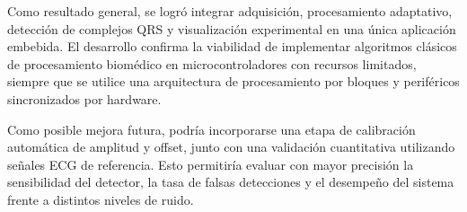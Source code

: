 \documentclass[12pt]{article}
\begin{document}
		Como resultado general, se logró integrar adquisición, procesamiento adaptativo, detección de complejos QRS y visualización experimental en una única aplicación embebida. El desarrollo confirma la viabilidad de implementar algoritmos clásicos de procesamiento biomédico en microcontroladores con recursos limitados, siempre que se utilice una arquitectura de procesamiento por bloques y periféricos sincronizados por hardware.

		Como posible mejora futura, podría incorporarse una etapa de calibración automática de amplitud y offset, junto con una validación cuantitativa utilizando señales ECG de referencia. Esto permitiría evaluar con mayor precisión la sensibilidad del detector, la tasa de falsas detecciones y el desempeño del sistema frente a distintos niveles de ruido.
\end{document}
